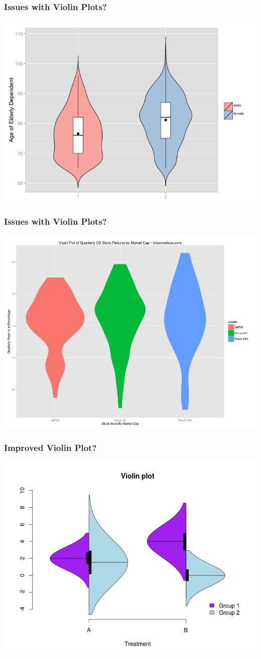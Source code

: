 \documentclass{beamer} %
\begin{document}
\begin{frame}\frametitle{Issues with Violin Plots?}
	\centering
	\includegraphics[width=\linewidth]{violin.png}
\end{frame}




\begin{frame}\frametitle{Issues with Violin Plots?}
	\centering
	\includegraphics[width=\linewidth]{violin2.png}
\end{frame}



\begin{frame}\frametitle{Improved Violin Plot?}
	\centering
	\includegraphics[width=\linewidth]{violin3.png}
\end{frame}
\end{document}
